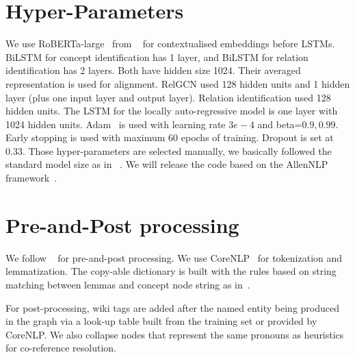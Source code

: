 \documentclass[11pt]{article}
\begin{document}
\section{Hyper-Parameters }
We use RoBERTa-large~\cite{Liu2019RoBERTaAR} from ~ for contextualised embeddings before LSTMs.  BiLSTM for concept identification has 1 layer, and BiLSTM for relation identification has 2 layers. Both have hidden size 1024. Their averaged representation is used for alignment. RelGCN used 128 hidden units and 1 hidden layer (plus one input layer and output layer). Relation identification used 128 hidden units. The LSTM for the locally auto-regressive model is one layer with 1024 hidden units. Adam~\cite{Kingma2015AdamAM} is used with learning rate $3e-4$ and beta=$0.9,0.99$. Early stopping is used with maximum 60 epochs of training. Dropout is set at 0.33. Those hyper-parameters are selected manually, we basically followed the standard model size as in ~\cite{lyu-titov-2018-amr,Zhang2019AMRPA}. We will release the code based on the AllenNLP framework~\cite{Gardner2018AllenNLPAD}.

\section{Pre-and-Post processing}
We follow ~ for pre-and-post processing. We use CoreNLP~\cite{manning-EtAl:2014:P14-5} for tokenization and lemmatization. The copy-able dictionary is built with the rules based on string matching between lemmas and concept node string as in~. 

For post-processing, wiki tags are added after the named entity being produced in the graph via a look-up table built from the training set or provided by CoreNLP. We also collapse nodes that represent the same pronouns as heuristics for co-reference resolution.
    
\end{document}
